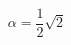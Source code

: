 \documentclass{article}
\begin{document}
\fontsize{23}{31}\selectfont
\vspace*{\fill}
\begin{center}
\[\alpha = \frac{1}{2} \sqrt{2} \]

\end{center}
\vspace*{\fill}
\end{document}
